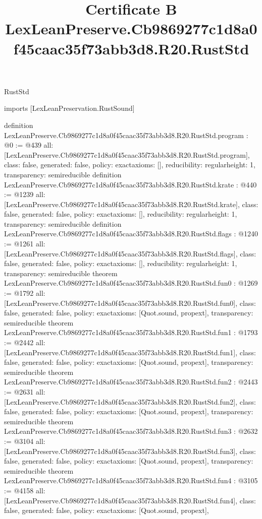 \begin{lexlean}{RustStd}
\title{Certificate B LexLeanPreserve.Cb9869277c1d8a0f45caac35f73abb3d8.R20.RustStd}
\begin{coremodule}
imports [LexLeanPreservation.RustSound]

definition LexLeanPreserve.Cb9869277c1d8a0f45caac35f73abb3d8.R20.RustStd.program : @0 := @439 {
  all: [LexLeanPreserve.Cb9869277c1d8a0f45caac35f73abb3d8.R20.RustStd.program],
  class: false,
  generated: false,
  policy: exact{axioms: []},
  reducibility: regular{height: 1},
  transparency: semireducible
}
definition LexLeanPreserve.Cb9869277c1d8a0f45caac35f73abb3d8.R20.RustStd.krate : @440 := @1239 {
  all: [LexLeanPreserve.Cb9869277c1d8a0f45caac35f73abb3d8.R20.RustStd.krate],
  class: false,
  generated: false,
  policy: exact{axioms: []},
  reducibility: regular{height: 1},
  transparency: semireducible
}
definition LexLeanPreserve.Cb9869277c1d8a0f45caac35f73abb3d8.R20.RustStd.flags : @1240 := @1261 {
  all: [LexLeanPreserve.Cb9869277c1d8a0f45caac35f73abb3d8.R20.RustStd.flags],
  class: false,
  generated: false,
  policy: exact{axioms: []},
  reducibility: regular{height: 1},
  transparency: semireducible
}
theorem LexLeanPreserve.Cb9869277c1d8a0f45caac35f73abb3d8.R20.RustStd.fun0 : @1269 := @1792 {
  all: [LexLeanPreserve.Cb9869277c1d8a0f45caac35f73abb3d8.R20.RustStd.fun0],
  class: false,
  generated: false,
  policy: exact{axioms: [Quot.sound, propext]},
  transparency: semireducible
}
theorem LexLeanPreserve.Cb9869277c1d8a0f45caac35f73abb3d8.R20.RustStd.fun1 : @1793 := @2442 {
  all: [LexLeanPreserve.Cb9869277c1d8a0f45caac35f73abb3d8.R20.RustStd.fun1],
  class: false,
  generated: false,
  policy: exact{axioms: [Quot.sound, propext]},
  transparency: semireducible
}
theorem LexLeanPreserve.Cb9869277c1d8a0f45caac35f73abb3d8.R20.RustStd.fun2 : @2443 := @2631 {
  all: [LexLeanPreserve.Cb9869277c1d8a0f45caac35f73abb3d8.R20.RustStd.fun2],
  class: false,
  generated: false,
  policy: exact{axioms: [Quot.sound, propext]},
  transparency: semireducible
}
theorem LexLeanPreserve.Cb9869277c1d8a0f45caac35f73abb3d8.R20.RustStd.fun3 : @2632 := @3104 {
  all: [LexLeanPreserve.Cb9869277c1d8a0f45caac35f73abb3d8.R20.RustStd.fun3],
  class: false,
  generated: false,
  policy: exact{axioms: [Quot.sound, propext]},
  transparency: semireducible
}
theorem LexLeanPreserve.Cb9869277c1d8a0f45caac35f73abb3d8.R20.RustStd.fun4 : @3105 := @4158 {
  all: [LexLeanPreserve.Cb9869277c1d8a0f45caac35f73abb3d8.R20.RustStd.fun4],
  class: false,
  generated: false,
  policy: exact{axioms: [Quot.sound, propext]},
}
\end{coremodule}
\end{lexlean}
